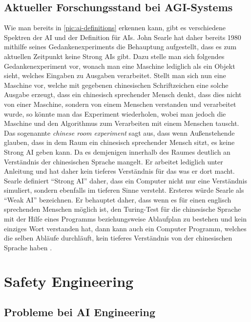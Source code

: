         \subsection{Aktueller Forschungsstand bei AGI-Systems}
            Wie man bereits in \ref{pic:ai-definitions} erkennen kann, gibt es verschiedene Spektren der AI und der
            Definition für AIs. John Searle hat daher bereits 1980 mithilfe seines Gedankenexperiments die Behauptung
            aufgestellt, dass es zum aktuellen Zeitpunkt keine Strong AIs gibt. Dazu stelle man sich folgendes
            Gedankenexperiment vor, wonach man eine Maschine lediglich als ein Objekt sieht, welches Eingaben zu
            Ausgaben verarbeitet. \cite{cole_2014} Stellt man sich nun eine Maschine vor, welche mit gegebenen
            chinesischen Schriftzeichen eine solche Ausgabe erzeugt, dass ein chinesisch sprechender Mensch denkt,
            dass dies nicht von einer Maschine, sondern von einem Menschen verstanden und verarbeitet wurde, so könnte
            man das Experiment wiederholen, wobei man jedoch die Maschine und den Algorithmus zum Verarbeiten mit einem
            Menschen tauscht.
            Das sogenannte \textit{chinese room experiment} sagt aus, dass wenn Außenstehende glauben,
            dass in dem Raum ein chinesisch sprechender Mensch sitzt, es keine Strong AI geben kann. Da es demjenigen
            innerhalb des Raumes deutlich an Verständnis der chinesischen Sprache mangelt. Er arbeitet lediglich unter
            Anleitung und hat daher kein tieferes Verständnis für das was er dort macht. Searle definiert
            ``Strong AI'' daher, dass ein Computer nicht nur eine Verständnis simuliert, sondern ebenfalls im tieferen
            Sinne versteht. Ersteres würde Searle als ``Weak AI'' bezeichnen. \cite{cole_2014} Er behauptet daher, dass
            wenn es für einen englisch sprechenden Menschen möglich ist, den Turing-Test für die chinesische Sprache mit
            der Hilfe eines Programms beziehungsweise Ablaufplan zu bestehen und kein einziges Wort verstanden hat, dann
            kann auch ein Computer Programm, welches die selben Abläufe durchläuft, kein tieferes Verständnis von der
            chinesischen Sprache haben .


    \section{Safety Engineering}
        \subsection{Probleme bei AI Engineering}
